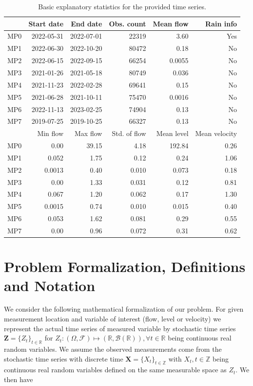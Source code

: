 \documentclass[12pt,a4paper]{article}
\begin{document}
\begin{table}[h]
\centering
\begin{tabular}{rrrrrr}
  \hline
 &Start date & End date & Obs. count & Mean flow & Rain info \\ 
  \hline
    MP0 & 2022-05-31 & 2022-07-01 & 22319 & 3.60 & Yes \\ 
    MP1 & 2022-06-30 & 2022-10-20 & 80472 & 0.18 & No \\ 
    MP2 & 2022-06-15 & 2022-09-15 & 66254 & 0.0055 & No \\ 
    MP3 & 2021-01-26 & 2021-05-18 & 80749 & 0.036 & No \\ 
    MP4 & 2021-11-23 & 2022-02-28 & 69641 &  0.15 & No \\ 
    MP5 & 2021-06-28 & 2021-10-11 & 75470 & 0.0016 & No \\ 
    MP6 & 2022-11-13 & 2023-02-25 & 74904 & 0.13 & No \\ 
    MP7 & 2019-07-25 & 2019-10-25 & 66327 & 0.13 & No \\ 
    \hline
    &Min flow & Max flow& Std. of flow& Mean level& Mean velocity\\
    \hline
    MP0 &  0.00 & 39.15 & 4.18 & 192.84 & 0.26 \\ 
    MP1 & 0.052 & 1.75 & 0.12 & 0.24 & 1.06\\ 
    MP2 & 0.0013 & 0.40 & 0.010 & 0.073 & 0.18  \\ 
    MP3 & 0.00 & 1.33 & 0.031 & 0.12 & 0.81 \\ 
    MP4 & 0.067 & 1.20 & 0.062 & 0.17 &  1.30 \\ 
    MP5 & 0.0015 & 0.74 & 0.010 & 0.015 & 0.40 \\ 
    MP6 & 0.053 & 1.62 & 0.081 & 0.29 & 0.55 \\ 
    MP7 & 0.00 & 0.96 & 0.072& 0.31 & 0.62 \\
    \hline
   \end{tabular}
\label{tab: Basic exp 1}
\caption{Basic explanatory statistics for the provided time series.}
\end{table} 


\newpage

\section{Problem Formalization, Definitions and Notation}

We consider the following mathematical formalization of our problem. For given measurement location and variable of interest (flow, level or velocity) we represent the actual time series of measured variable by stochastic time series $\mathbf{Z} = \lbrace Z_t \rbrace_{t \in \mathbb{R}}$ for $Z_t:    (\Omega, \mathcal{F}) \mapsto (\mathbb{R}, \mathcal{B}(\mathbb{R})), \forall t \in \mathbb{R}$ being continuous real random variables. We assume the observed measurements come from  the stochastic time series with discrete time $ \mathbf{X} = \lbrace X_t \rbrace_{t \in \mathbb{Z}}$  with $X_t, t \in \mathbb{Z}$ being continuous real random variables defined on the same measurable space as $Z_t$. We then have 
\end{document}
